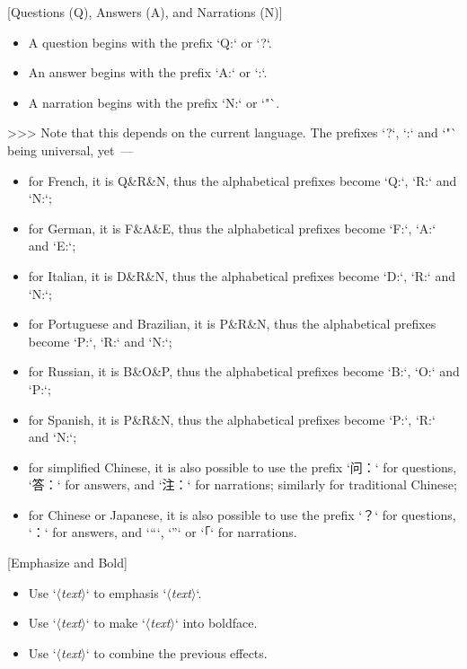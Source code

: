 \documentclass[%
  use style = classical,
  scroll,
]{Q-and-A}
\newcommand{\meta}[1]{$\langle${\normalfont\itshape#1}$\rangle$}
\begin{document}
  [Questions (Q), Answers (A), and Narrations (N)]
  \begin{itemize}
    \item A question begins with the prefix `Q:` or `?`.
    \item An answer begins with the prefix `A:` or `:`.
    \item A narration begins with the prefix `N:` or `"`.
  \end{itemize}
  >>> Note that this depends on the current language. The prefixes `?`, `:` and `"` being universal, yet~—
  \begin{itemize}
    \item for French, it is Q\&R\&N, thus the alphabetical prefixes become `Q:`, `R:` and `N:`;
    \item for German, it is F\&A\&E, thus the alphabetical prefixes become `F:`, `A:` and `E:`;
    \item for Italian, it is D\&R\&N, thus the alphabetical prefixes become `D:`, `R:` and `N:`;
    \item for Portuguese and Brazilian, it is P\&R\&N, thus the alphabetical prefixes become `P:`, `R:` and `N:`;
    \item for Russian, it is B\&O\&P, thus the alphabetical prefixes become `B:`, `O:` and `P:`;
    \item for Spanish, it is P\&R\&N, thus the alphabetical prefixes become `P:`, `R:` and `N:`;
    \item for simplified Chinese, it is also possible to use the prefix `问：` for questions, `答：` for answers, and `注：` for narrations; similarly for traditional Chinese;
    \item for Chinese or Japanese, it is also possible to use the prefix `？` for questions, `：` for answers, and `“`, `”` or `「` for narrations.
  \end{itemize}

  [Emphasize and Bold]
  \begin{itemize}
    \item Use `\textasterisk\meta{text}\textasterisk` to emphasis `\meta{text}`.
    \item Use `\textasterisk\textasterisk\meta{text}\textasterisk\textasterisk` to make `\meta{text}` into boldface.
    \item Use `\textasterisk\textasterisk\textasterisk\meta{text}\textasterisk\textasterisk\textasterisk` to combine the previous effects.
  \end{itemize}
\end{document}
